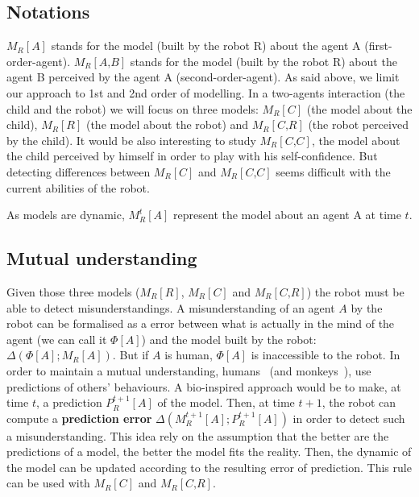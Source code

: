 \documentclass[10pt,a4paper]{article}
\begin{document}
\subsection{Notations}
$M_R\left[\textit{A}\right]$ stands for \textcolor{wine}{the model (built by the robot R) about the agent A} (first-order-agent). $M_R\left[\textit{A,B}\right]$ stands for \textcolor{wine}{the model (built by the robot R) about the agent B perceived by the agent A} (second-order-agent). 
As said above, we limit our approach to 1st and 2nd order of modelling. In a two-agents interaction (the child and the robot) we will focus on three models: $ M_R\left[\textit{C}\right]$ (the model about the child), $ M_R\left[\textit{R}\right]$ (the model about the robot) and $ M_R\left[\textit{C,R}\right]$ (the robot perceived by the child). 
It would be also interesting to study $ M_R\left[\textit{C,C}\right]$, the model about the child perceived by himself in order to play with his self-confidence. But detecting differences between $ M_R\left[\textit{C}\right]$ and $ M_R\left[\textit{C,C}\right]$ seems difficult with the current abilities of the robot. 

As models are dynamic, $ M^t_R\left[\textit{A}\right]$ represent the model about an agent A at time $t$.

\subsection{Mutual understanding}
Given those three models ($ M_R\left[\textit{R}\right]$, $ M_R\left[\textit{C}\right]$ and $ M_R\left[\textit{C,R}\right]$) the robot must be able to detect misunderstandings. 
A misunderstanding of an agent $A$ by the robot can be formalised as a error between what is actually in the mind of the agent (we can call it $\Phi[A]$) and the model built by the robot: $\Delta \left(\Phi[A] ; M_R\left[\textit{A}\right]\right)$. But if $A$ is human, $\Phi[A]$ is inaccessible to the robot. In order to maintain a mutual understanding, humans~\cite{suzuki2015neural} (and monkeys~\cite{haroush2015neuronal}), use predictions of others' behaviours. A bio-inspired approach would be to make, at time $t$, a prediction $P^{t+1}_R\left[\textit{A}\right]$ of the model. Then, at time $t+1$, the robot can compute a \textbf{prediction error} $\Delta \left( M^{t+1}_R\left[\textit{A}\right]; P^{t+1}_R\left[\textit{A}\right]\right)$ in order to detect such a misunderstanding. This idea rely on the assumption that the better are the predictions of a model, the better the model fits the reality. Then, the dynamic of the model can be updated according to the resulting error of prediction. This rule can be used with $ M_R\left[\textit{C}\right]$ and $ M_R\left[\textit{C,R}\right]$. 
\end{document}
